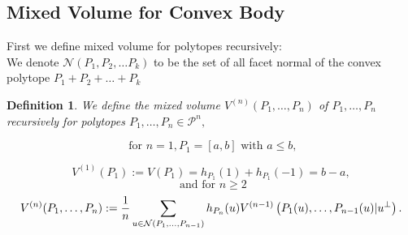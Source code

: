 \documentclass[oneside]{book}
\newtheorem{mydef}{Definition}[section]
\begin{document}
	\subsection{Mixed Volume for Convex Body}
	\label{ss:20.5}
	First we define mixed volume for polytopes recursively:  \\
	We denote  $ \mathcal{N}(P_{1},P_{2},\ldots P_{k})$ to be the set of all facet normal of the convex polytope $P_{1}+P_{2}+ \ldots + P_{k}$
	\begin{mydef} \label{d:18}
		We define the mixed volume $V^{(n)}\left(P_{1}, \ldots, P_{n}\right)$ of $P_{1}, \ldots, P_{n}$ recursively for polytopes $P_{1}, \ldots, P_{n} \in \mathcal{P}^{n},$ 
		
		$$ \text{ for } n = 1, P_{1}=[a, b] \text { with } a \leq b,$$ 
		
		\begin{equation}
		\label{eq49}
		V^{(1)}\left(P_{1}\right):=V\left(P_{1}\right)=h_{P_{1}}(1)+h_{P_{1}}(-1) = b - a,  
		\end{equation} 
		$$\text{ and} \text { for } n \geq 2 $$ 
		\begin{equation} \label{eq50}
		\\
		V^{(n)}(P_{1}, \ldots, P_{n}):=\frac{1}{n} \sum_{u \in \mathcal{N}(P_{1}, \ldots, P_{n-1})} h_{P_{n}}(u) V^{(n-1)}\left(P_{1}(u), \ldots, P_{n-1}(u)| u^{\perp}\right).
		\end{equation}
	\end{mydef}     
\end{document}
